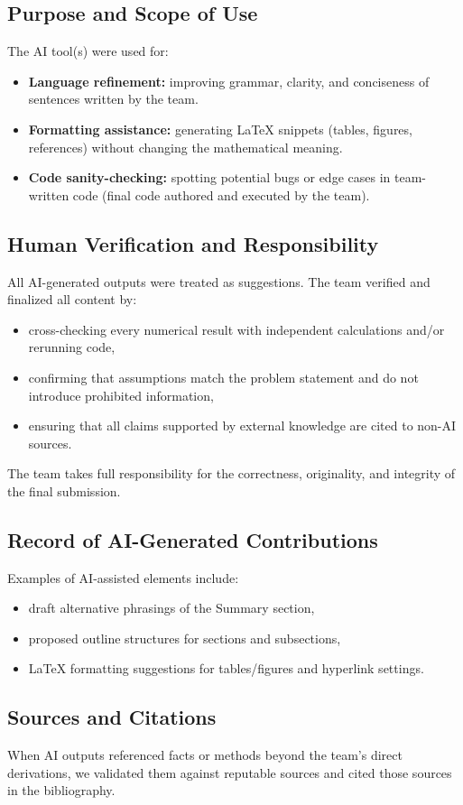 \documentclass[12pt]{article}
\begin{document}
\subsection*{Purpose and Scope of Use}
The AI tool(s) were used for:
\begin{itemize}
  \item \textbf{Language refinement:} improving grammar, clarity, and conciseness of sentences written by the team.
  \item \textbf{Formatting assistance:} generating LaTeX snippets (tables, figures, references) without changing the mathematical meaning.
  \item \textbf{Code sanity-checking:} spotting potential bugs or edge cases in team-written code (final code authored and executed by the team).
\end{itemize}

\subsection*{Human Verification and Responsibility}
All AI-generated outputs were treated as suggestions. The team verified and finalized all content by:
\begin{itemize}
  \item cross-checking every numerical result with independent calculations and/or rerunning code,
  \item confirming that assumptions match the problem statement and do not introduce prohibited information,
  \item ensuring that all claims supported by external knowledge are cited to non-AI sources.
\end{itemize}
The team takes full responsibility for the correctness, originality, and integrity of the final submission.

\subsection*{Record of AI-Generated Contributions}
Examples of AI-assisted elements include:
\begin{itemize}
  \item draft alternative phrasings of the Summary section,
  \item proposed outline structures for sections and subsections,
  \item LaTeX formatting suggestions for tables/figures and hyperlink settings.
\end{itemize}

\subsection*{Sources and Citations}
When AI outputs referenced facts or methods beyond the team's direct derivations, we validated them against reputable sources and cited those sources in the bibliography.
\end{document}
